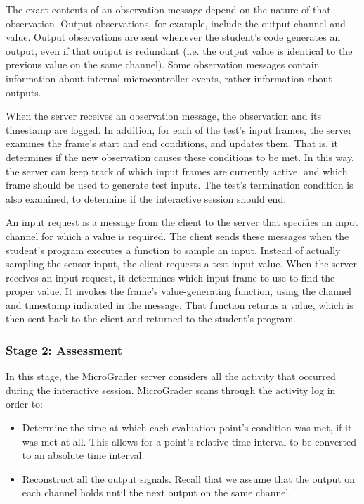 \documentclass[12pt]{article}
\begin{document}
The exact contents of an observation message depend on the nature of that observation.  Output observations, for example, include the output channel and value.  Output observations are sent whenever the student's code generates an output, even if that output is redundant (i.e. the output value is identical to the previous value on the same channel).  Some observation messages contain information about internal microcontroller events, rather information about outputs.

When the server receives an observation message, the observation and its timestamp are logged.  In addition, for each of the test's input frames, the server examines the frame's start and end conditions, and updates them.  That is, it determines if the new observation causes these conditions to be met.  In this way, the server can keep track of which input frames are currently active, and which frame should be used to generate test inputs.  The test's termination condition is also examined, to determine if the interactive session should end.

An input request is a message from the client to the server that specifies an input channel for which a value is required.  The client sends these messages when the student's program executes a function to sample an input.  Instead of actually sampling the sensor input, the client requests a test input value.  When the server receives an input request, it determines which input frame to use to find the proper value.  It invokes the frame's value-generating function, using the channel and timestamp indicated in the message.  That function returns a value, which is then sent back to the client and returned to the student's program.

\subsubsection{Stage 2: Assessment}
In this stage, the MicroGrader server considers all the activity that occurred during the interactive session.  MicroGrader scans through the activity log in order to:

\begin{itemize}
\item Determine the time at which each evaluation point's condition was met, if it was met at all.  This allows for a point's relative time interval to be converted to an absolute time interval.
\item Reconstruct all the output signals.  Recall that we assume that the output on each channel holds until the next output on the same channel.
\end{itemize}
\end{document}

